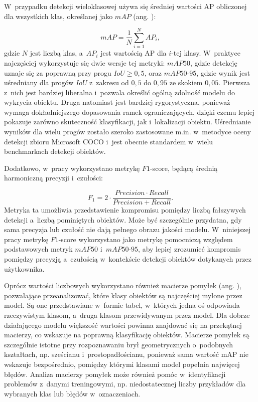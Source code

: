 W~przypadku detekcji wieloklasowej używa się średniej wartości AP obliczonej dla wszystkich klas, określanej jako $mAP$ (ang. ):

\begin{equation}
    mAP = \frac{1}{N} \sum_{i=1}^{N} AP_i,
\end{equation}
gdzie $N$ jest liczbą klas, a~$AP_i$ jest wartością AP dla $i$-tej klasy. W~praktyce najczęściej wykorzystuje się dwie wersje tej metryki: $mAP50$, gdzie detekcję uznaje się za poprawną przy progu $IoU \geq 0,5$, oraz $mAP50\text{-}95$, gdzie wynik jest uśredniany dla progów $IoU$ z~zakresu od $0,5$ do $0,95$ ze skokiem $0,05$. Pierwsza z~nich jest bardziej liberalna i~pozwala określić ogólną zdolność modelu do wykrycia obiektu. Druga natomiast jest bardziej rygorystyczna, ponieważ wymaga dokładniejszego dopasowania ramek ograniczających, dzięki czemu lepiej pokazuje zarówno skuteczność klasyfikacji, jak i~lokalizacji obiektu. Uśrednianie wyników dla wielu progów zostało szeroko zastosowane m.in. w~metodyce oceny detekcji zbioru Microsoft COCO \cite{bib:microsoftCOCO} i~jest obecnie standardem w~wielu benchmarkach detekcji obiektów.

Dodatkowo, w~pracy wykorzystano metrykę $F1$-score, będącą średnią harmoniczną precyzji i~czułości:

\begin{equation}
    F_1 = 2 \cdot \frac{Precision \cdot Recall}{Precision + Recall}.
\end{equation}
Metryka ta umożliwia przedstawienie kompromisu pomiędzy liczbą fałszywych detekcji a~liczbą pominiętych obiektów. Może być szczególnie przydatna, gdy sama precyzja lub czułość nie dają pełnego obrazu jakości modelu. W~niniejszej pracy metrykę $F1$-score wykorzystano jako metrykę pomocniczą względem podstawowych metryk $mAP50$ i~$mAP50\text{-}95$, aby lepiej zrozumieć kompromis pomiędzy precyzją a~czułością w~kontekście detekcji obiektów dotykanych przez użytkownika.

Oprócz wartości liczbowych wykorzystano również macierze pomyłek (ang. ), pozwalające przeanalizować, które klasy obiektów są najczęściej mylone przez model. Są one przedstawiane w~formie tabel, w~których jedna oś odpowiada rzeczywistym klasom, a~druga klasom przewidywanym przez model. Dla dobrze działającego modelu większość wartości powinna znajdować się na przekątnej macierzy, co wskazuje na poprawną klasyfikację obiektów. Macierze pomyłek są szczególnie istotne przy rozpoznawaniu brył geometrycznych o~podobnych kształtach, np. sześcianu i~prostopadłościanu, ponieważ sama wartość mAP nie wskazuje bezpośrednio, pomiędzy którymi klasami model popełnia najwięcej błędów. Analiza macierzy pomyłek może również pomóc w~identyfikacji problemów z~danymi treningowymi, np. niedostatecznej liczby przykładów dla wybranych klas lub błędów w~oznaczeniach.

